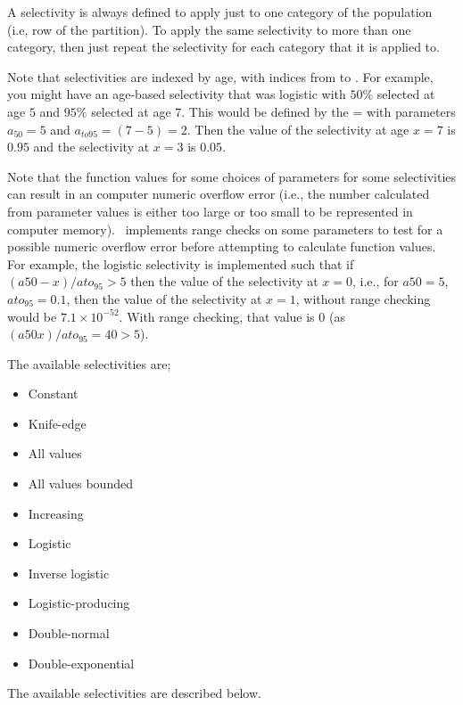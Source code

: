 A selectivity is always defined to apply just to one category of the population (i.e, row of the partition). To apply the same selectivity to more than one category, then just repeat the selectivity for each category that it is applied to.

Note that selectivities are indexed by age, with indices from  to . For example, you might have an age-based selectivity that was logistic with $50\%$ selected at age $5$ and $95\%$ selected at age $7$. This would be defined by the = with parameters $a_{50}=5$ and $a_{to95}=(7-5)=2$. Then the value of the selectivity at age $x=7$ is $0.95$ and the selectivity at $x=3$ is $0.05$.

Note that the function values for some choices of parameters for some selectivities can result in an computer numeric overflow error (i.e., the number calculated from parameter values is either too large or too small to be represented in computer memory). \SPM\ implements range checks on some parameters to test for a possible numeric overflow error before attempting to calculate function values. For example, the logistic selectivity is implemented such that if $(a50-x)/ato_95 > 5$ then the value of the selectivity at $x=0$, i.e., for $a50=5$, $ato_95=0.1$, then the value of the selectivity at $x=1$, without range checking would be $7.1 \times 10^{-52}$. With range checking, that value is $0$ (as $(a50 x)/ato_95=40 > 5$).

The available selectivities are;

\begin{itemize}
  \item Constant
  \item Knife-edge
  \item All values
  \item All values bounded
  \item Increasing
  \item Logistic
	\item Inverse logistic
  \item Logistic-producing
  \item Double-normal
  \item Double-exponential
\end{itemize}

The available selectivities are described below.

\subsubsection[Constant]{}

